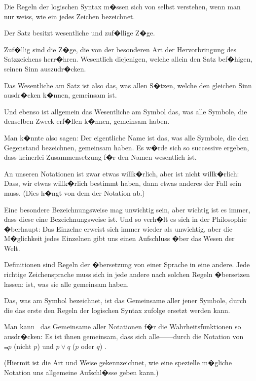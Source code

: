 {Die Regeln der logischen Syntax m�ssen sich
von selbst verstehen, wenn man nur weiss, wie
ein jedes Zeichen bezeichnet.}


{Der Satz besitzt wesentliche und zuf�llige Z�ge.

Zuf�llig sind die Z�ge, die von der besonderen
Art der Hervorbringung des Satzzeichens herr�hren.
Wesentlich diejenigen, welche allein den Satz bef�higen,
seinen Sinn auszudr�cken.}


{Das Wesentliche am Satz ist also das, was allen
S�tzen, welche den gleichen Sinn ausdr�cken
k�nnen, gemeinsam ist.

Und ebenso ist allgemein das Wesentliche am
Symbol das, was alle Symbole, die denselben
Zweck erf�llen k�nnen, gemeinsam haben.}


{Man k�nnte also sagen: Der eigentliche Name
ist das, was alle Symbole, die den Gegenstand
bezeichnen, gemeinsam haben. Es w�rde sich so
successive ergeben, dass keinerlei Zusammensetzung
f�r den Namen wesentlich ist.}


{An unseren Notationen ist zwar etwas willk�rlich,
aber  ist nicht willk�rlich: Dass,  wir
etwas willk�rlich bestimmt haben, dann etwas
anderes der Fall sein muss. (Dies h�ngt von dem
 der Notation ab.)}


{{\stretchyspace
Eine besondere Bezeichnungsweise mag unwichtig
sein, aber wichtig ist es immer, dass diese
eine  Bezeichnungsweise ist. Und so
verh�lt es sich in der Philosophie �berhaupt: Das
Einzelne erweist sich immer wieder als unwichtig,
aber die M�glichkeit jedes Einzelnen gibt uns
einen Aufschluss �ber das Wesen der Welt.}}


{Definitionen sind Regeln der �bersetzung von
einer Sprache in eine andere. Jede richtige Zeichensprache
muss sich in jede andere nach solchen
Regeln �bersetzen lassen:  ist, was sie alle
gemeinsam haben.}


{Das, was am Symbol bezeichnet, ist das Gemeinsame
aller jener Symbole, durch die das erste den
Regeln der logischen Syntax zufolge ersetzt werden
kann.}


{Man kann \zumBeispiel\ das Gemeinsame aller Notationen
f�r die Wahrheitsfunktionen so ausdr�cken: Es ist
ihnen gemeinsam, dass sich alle---\zumBeispiel---durch die
Notation von \glqq{}$\Not{p}$\grqq{} (\glqq{}nicht $p$\grqq{}) und \glqq{}$p \lor q$\grqq{} (\glqq{}$p$ oder $q$\grqq{})
.

{\stretchyspace
(Hiermit ist die Art und Weise gekennzeichnet,
wie eine spezielle m�gliche Notation uns allgemeine
Aufschl�sse geben kann.)}}


